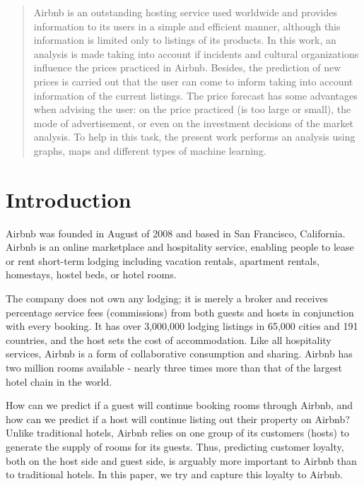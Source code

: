 \documentclass[sigconf]{acmart}
\begin{document}
\begin{abstract}
	Airbnb is an outstanding hosting service used worldwide and provides information to its users in a simple and efficient manner, although this information is limited only to listings of its products. In this work, an analysis is made taking into account if incidents and cultural organizations influence the prices practiced in Airbnb. Besides, the prediction of new prices is carried out that the user can come to inform taking into account information of the current listings. The price forecast has some advantages when advising the user: on the price practiced (is too large or small), the mode of advertisement, or even on the investment decisions of the market analysis. To help in this task, the present work performs an analysis using graphs, maps and different types of machine learning.
\end{abstract}


\maketitle

\vspace{-0.5cm}
\section{Introduction}

Airbnb was founded in August of 2008 and based in San Francisco, California. Airbnb is an online marketplace and hospitality service, enabling people to lease or rent short-term lodging including vacation rentals, apartment rentals, homestays, hostel beds, or hotel rooms. 

The company does not own any lodging; it is merely a broker and receives percentage service fees (commissions) from both guests and hosts in conjunction with every booking. It has over 3,000,000 lodging listings in 65,000 cities and 191 countries, and the host sets the cost of accommodation. Like all hospitality services, Airbnb is a form of collaborative consumption and sharing. Airbnb has two million rooms available - nearly three times more than that of the largest hotel chain in the world. 

How can we predict if a guest will continue booking rooms through Airbnb, and how can we predict if a host will continue listing out their property on Airbnb? Unlike traditional hotels, Airbnb relies on one group of its customers (hosts) to generate the supply of rooms for its guests. Thus, predicting customer loyalty, both on the host side and guest side, is arguably more important to Airbnb than to traditional hotels. In this paper, we try and capture this loyalty to Airbnb.
\end{document}
